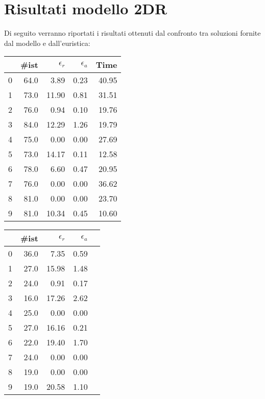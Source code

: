 \newpage
\section{Risultati modello 2DR}
Di seguito verranno riportati i risultati ottenuti dal confronto tra soluzioni fornite dal modello e dall'euristica:
\begin{center}
	\begin{table}[H]
		\begin{minipage}{0.4\textwidth}
			\centering
			\begin{tabular}{lrrrr}
				\toprule
				{} & \#ist & $\epsilon_r$ & $\epsilon_a$ & Time  \\
				\midrule
				0  & 64.0  & 3.89         & 0.23         & 40.95 \\
				1  & 73.0  & 11.90        & 0.81         & 31.51 \\
				2  & 76.0  & 0.94         & 0.10         & 19.76 \\
				3  & 84.0  & 12.29        & 1.26         & 19.79 \\
				4  & 75.0  & 0.00         & 0.00         & 27.69 \\
				5  & 73.0  & 14.17        & 0.11         & 12.58 \\
				6  & 78.0  & 6.60         & 0.47         & 20.95 \\
				7  & 76.0  & 0.00         & 0.00         & 36.62 \\
				8  & 81.0  & 0.00         & 0.00         & 23.70 \\
				9  & 81.0  & 10.34        & 0.45         & 10.60 \\
				\bottomrule
			\end{tabular}
		\end{minipage}
		\begin{minipage}{0.5\textwidth}
			\centering
			\begin{tabular}{lrrrr}
				\toprule
				{} & \#ist & $\epsilon_r$ & $\epsilon_a$ \\
				\midrule
				0  & 36.0  & 7.35         & 0.59         \\
				1  & 27.0  & 15.98        & 1.48         \\
				2  & 24.0  & 0.91         & 0.17         \\
				3  & 16.0  & 17.26        & 2.62         \\
				4  & 25.0  & 0.00         & 0.00         \\
				5  & 27.0  & 16.16        & 0.21         \\
				6  & 22.0  & 19.40        & 1.70         \\
				7  & 24.0  & 0.00         & 0.00         \\
				8  & 19.0  & 0.00         & 0.00         \\
				9  & 19.0  & 20.58        & 1.10         \\
				\bottomrule
			\end{tabular}
		\end{minipage}
	\end{table}
\end{center}
